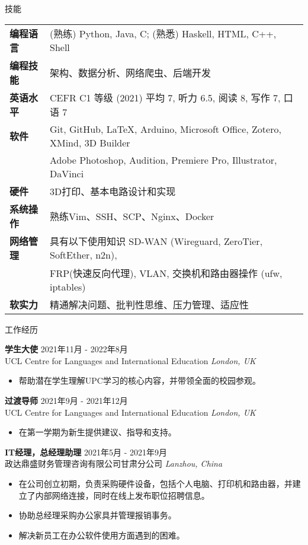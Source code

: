 \documentclass{resume_cn} %
\begin{document}
\begin{rSection}{技能}

    \begin{tabular}{ @{} >{\bfseries}l @{\hspace{6ex}} l }
    编程语言 & (熟练) Python, Java, C; (熟悉) Haskell, HTML, C++, Shell
    \\
    编程技能 & 架构、数据分析、网络爬虫、后端开发
    \\
    英语水平 & CEFR C1 等级 (2021) 平均 7, 听力 6.5, 阅读 8, 写作 7, 口语 7
    \\
    软件 & Git, GitHub, \LaTeX, Arduino, Microsoft Office, Zotero, XMind, 3D Builder \\
    & Adobe Photoshop, Audition, Premiere Pro, Illustrator, DaVinci
    \\
    硬件 & 3D打印、基本电路设计和实现
    \\
    系统操作 & 熟练Vim、SSH、SCP、Nginx、Docker
    \\
    网络管理 & 具有以下使用知识 SD-WAN (Wireguard, ZeroTier, SoftEther, n2n), \\ 
    & FRP(快速反向代理), VLAN, 交换机和路由器操作 (ufw, iptables)\\
    软实力 & 精通解决问题、批判性思维、压力管理、适应性
    \end{tabular}
\end{rSection}
    
\begin{rSection}{工作经历}
    
    \textbf{学生大使} \hfill 2021年11月 - 2022年8月\\
    UCL Centre for Languages and International Education \hfill \textit{London, UK}
    \begin{itemize}
        \itemsep -3pt {} 
        \item 帮助潜在学生理解UPC学习的核心内容，并带领全面的校园参观。
    \end{itemize}
    
    \textbf{过渡导师} \hfill 2021年9月 - 2021年12月\\
    UCL Centre for Languages and International Education \hfill \textit{London, UK}
    \begin{itemize}
        \itemsep -3pt {} 
        \item 在第一学期为新生提供建议、指导和支持。
    \end{itemize}
     
    \textbf{IT经理，总经理助理} \hfill 2021年5月 - 2021年9月\\
    政达鼎盛财务管理咨询有限公司甘肃分公司 \hfill \textit{Lanzhou, China}
    \begin{itemize}
        \itemsep -3pt {} 
        \item 在公司创立初期，负责采购硬件设备，包括个人电脑、打印机和路由器，并建立了内部网络连接，同时在线上发布职位招聘信息。
        \item 协助总经理采购办公家具并管理报销事务。
        \item 解决新员工在办公软件使用方面遇到的困难。
    \end{itemize}
    
\end{rSection} 
    
\end{document}

